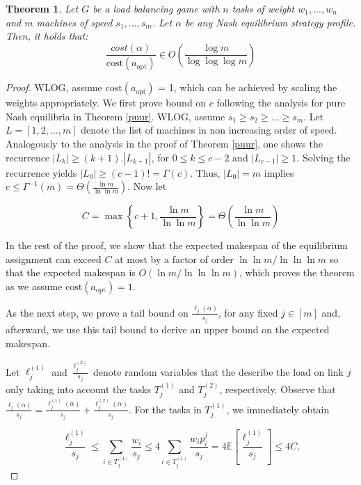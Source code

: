 \documentclass[a4paper,11pt]{article}
\newtheorem{theorem}{Theorem}[section]
\newcommand{\E}{{\mathbb E}}
\newcommand{\cost}{\text{cost}}
\newcommand{\opt}{\text{opt}}
\newcommand{\copt}{\cost(a_{\opt})}
\begin{document}
\begin{theorem}\label{mei} Let $G$ be a load balancing game with $n$ tasks of weight $w_1,...,w_n$ and $m$ machines of speed $s_1,...,s_m$. Let $\alpha$ be any Nash equilibrium strategy profile. Then, it holds that:
$$\frac{cost(\alpha)}{\cost(a_{\opt})} \in O\left(\frac{\log m}{\log \log \log m}\right)$$
\end{theorem}
\begin{proof}
WLOG, assume $\copt$ = 1, which can be achieved by scaling the weights appropriately. We first prove bound on $c$ following the analysis for pure Nash equilibria in Theorem \ref{puur}. WLOG, assume $s_1 \geq s_2 \geq ... \geq s_m$. Let $L = [1,2,...,m]$ denote the list of machines in non increasing order of speed. Analogously to the analysis in the proof of Theorem \ref{puur}, one shows the recurrence $|L_k| \geq (k+1).|L_{k+1}|$, for $0 \leq k \leq c - 2$ and $|L_{c-1}| \geq 1$. Solving the recurrence yields $|L_0| \geq (c-1)! = \Gamma(c)$. Thus, $|L_0| = m$ implies $c \leq \Gamma^{-1}(m) = \Theta(\frac{\ln m}{\ln \ln m})$. Now let

$$C = \max\left\{c+1, \frac{\ln m}{\ln \ln m} \right\} = \Theta\left(\frac{\ln m}{\ln\ln m} \right)$$

In the rest of the proof, we show that the expected makespan of the equilibrium assignment can exceed $C$ at most by a factor of order $\ln\ln m/\ln \ln \ln m$ so that the expected makespan is $O(\ln m/\ln\ln\ln m)$, which proves the theorem as we assume $\copt = 1$.

As the next step, we prove a tail bound on $\frac{\ell_j(\alpha)}{s_j}$, for any fixed $j \in [m]$ and, afterward, we use this tail bound to derive an upper bound on the expected makespan.

Let $\ell_j^{(1)}$ and $\frac{\ell_j^{(2)}}{s_j}$ denote random variables that the describe the load on link $j$ only taking into account the tasks $T_j^{(1)}$ and $T_j^{(2)}$, respectively. Observe that $\frac{\ell_j(\alpha)}{s_j} = \frac{\ell_j^{(1)}(\alpha)}{s_j} + \frac{\ell_j^{(2)}(\alpha)}{s_j}$. For the tasks in $T_j^{(1)}$, we immediately obtain

\begin{equation}\label{equation1}
\frac{\ell_j^{(1)}}{s_j} \leq \displaystyle\sum_{i\in T_j^{(1)}}{\frac{w_i}{s_j}} \leq 4 \displaystyle\sum_{i\in T_j^{(1)}}{\frac{w_i p^j_i}{s_j}} = 4\E[\frac{\ell^(1)_j}{s_j}] \leq 4C.
\end{equation}


\end{proof}
\end{document}
